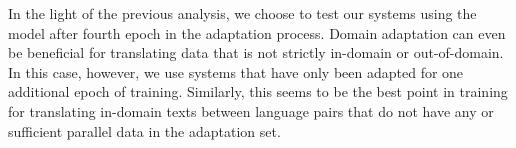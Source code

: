 \documentclass[a4paper,11pt]{article}
\begin{document}
In the light of the previous analysis, we choose to test our systems using the model after fourth epoch in the adaptation process. Domain adaptation can even be beneficial for translating data that is not strictly in-domain or out-of-domain. In this case, however, we use systems that have only been adapted for one additional epoch of training. Similarly, this seems to be the best point in training for translating in-domain texts between language pairs that do not have any or sufficient parallel data in the adaptation set.

% 



\newcommand{\da}{$\downarrow$}
\newcommand{\ua}{$\uparrow$}
\end{document}
